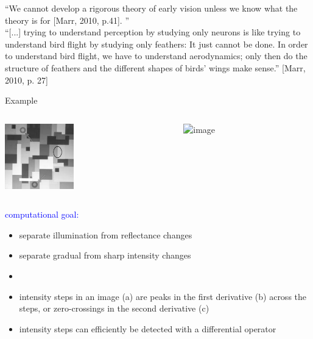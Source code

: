 \documentclass[]{beamer}
\begin{document}
 
\begin{frame}
 ``We cannot develop a rigorous theory of early vision unless we know what the theory is for [Marr, 2010, p.41]. ''\\
\vspace{5mm}
 {``[...] trying to understand perception by studying only neurons is like trying to understand bird flight by studying only feathers: It just cannot be done. In order to understand bird flight, we have to understand
aerodynamics; only then do the structure of feathers and the different shapes of birds' wings make sense.'' [Marr, 2010, p. 27]}
\end{frame}




\begin{frame}{Example}
 \begin{overlayarea}{110mm}{35mm}
\begin{columns}[T]
 \begin{column}{30mm}
\includegraphics[width=30mm]{figs/mondrian_edge.png}
 \end{column}

 \begin{column}{80mm}
\includegraphics<3->[width=80mm]{figs/luminance_zero.jpg}
 \end{column}
\end{columns}
\end{overlayarea}
\textcolor{blue}{computational goal:}
\begin{itemize}
 \item  separate illumination from reflectance changes 
 \item<2->[$\rightarrow$] separate gradual from sharp intensity changes
\item[]
 \item<3-> intensity steps in an image (a) are peaks in the first derivative (b) across the steps, or zero-crossings in the second derivative (c)
 \item<4-> intensity steps can efficiently be detected with a differential operator 
\end{itemize}
\end{frame}
\end{document}
